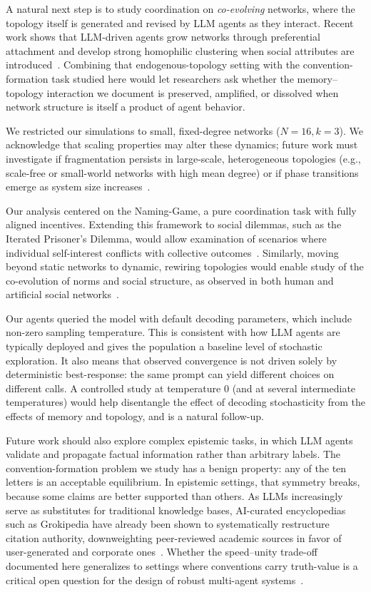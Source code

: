 \documentclass{article}
\begin{document}
A natural next step is to study coordination on \emph{co-evolving} networks, where the topology itself is generated and revised by LLM agents as they interact. Recent work shows that LLM-driven agents grow networks through preferential attachment and develop strong homophilic clustering when social attributes are introduced~\cite{mehdizadeh2025homophily}. Combining that endogenous-topology setting with the convention-formation task studied here would let researchers ask whether the memory--topology interaction we document is preserved, amplified, or dissolved when network structure is itself a product of agent behavior.

We restricted our simulations to small, fixed-degree networks ($N=16, k=3$). We acknowledge that scaling properties may alter these dynamics; future work must investigate if fragmentation persists in large-scale, heterogeneous topologies (e.g., scale-free or small-world networks with high mean degree) or if phase transitions emerge as system size increases~\cite{kim2025towards}.

Our analysis centered on the Naming-Game, a pure coordination task with fully aligned incentives. Extending this framework to social dilemmas, such as the Iterated Prisoner’s Dilemma, would allow examination of scenarios where individual self-interest conflicts with collective outcomes~\cite{nowak1992evolutionary}. Similarly, moving beyond static networks to dynamic, rewiring topologies would enable study of the co-evolution of norms and social structure, as observed in both human and artificial social networks~\cite{gross2008adaptive}.

Our agents queried the model with default decoding parameters, which include non-zero sampling temperature. This is consistent with how LLM agents are typically deployed and gives the population a baseline level of stochastic exploration. It also means that observed convergence is not driven solely by deterministic best-response: the same prompt can yield different choices on different calls. A controlled study at temperature 0 (and at several intermediate temperatures) would help disentangle the effect of decoding stochasticity from the effects of memory and topology, and is a natural follow-up.

Future work should also explore complex epistemic tasks, in which LLM agents validate and propagate factual information rather than arbitrary labels. The convention-formation problem we study has a benign property: any of the ten letters is an acceptable equilibrium. In epistemic settings, that symmetry breaks, because some claims are better supported than others. As LLMs increasingly serve as substitutes for traditional knowledge bases, AI-curated encyclopedias such as Grokipedia have already been shown to systematically restructure citation authority, downweighting peer-reviewed academic sources in favor of user-generated and corporate ones~\cite{mehdizadeh2025epistemic}. Whether the speed--unity trade-off documented here generalizes to settings where conventions carry truth-value is a critical open question for the design of robust multi-agent systems~\cite{shin2025automating}.
\end{document}
